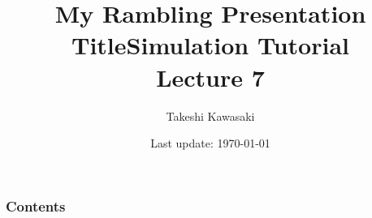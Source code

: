 \documentclass[aspectratio=169,dvipdfmx,cjk,handout,hyperref,8pt]{beamer} %
\title[Title Without Rambling]{My Rambling Presentation Title}
\theoremstyle{example}
\begin{document}
\title[Simulation Tutorial]{\bf Simulation Tutorial\\Lecture 7} 
\author[Kawasaki]{Takeshi Kawasaki}       %
\date{Last update: \today}
\begin{frame}                  %
\titlepage                     %
\end{frame}


\begin{frame}                  %
\frametitle{\bf Contents} 
\tableofcontents
\end{frame}
\end{document}
